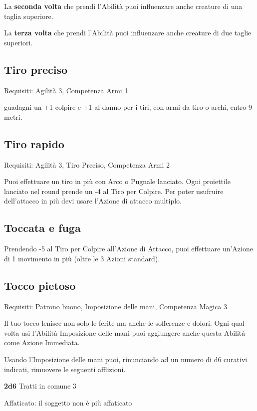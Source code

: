 \documentclass[a4paper,11pt,twoside,openany]{book}
\begin{document}
La \textbf{seconda volta} che prendi l'Abilità puoi influenzare anche creature di una taglia superiore.

La \textbf{terza volta} che prendi l'Abilità puoi influenzare anche creature di due taglie superiori.

\subsection{Tiro preciso}

Requisiti: Agilità 3, Competenza Armi 1

guadagni un +1 colpire e +1 al danno per i tiri, con armi da tiro o archi, entro 9 metri.

\subsection{Tiro rapido}

Requisiti: Agilità 3, Tiro Preciso, Competenza Armi 2

Puoi effettuare un tiro in più con Arco o Pugnale lanciato. Ogni
proiettile lanciato nel round prende un -4 al Tiro per Colpire. Per
poter usufruire dell'attacco in più devi usare l'Azione di attacco
multiplo.

\subsection{Toccata e fuga}

Prendendo -5 al Tiro per Colpire all'Azione di Attacco, puoi effettuare un'Azione di 1 movimento in più (oltre le 3 Azioni standard).

\subsection{Tocco pietoso}

Requisiti: Patrono buono, Imposizione delle mani, Competenza Magica 3

Il tuo tocco lenisce non solo le ferite ma anche le sofferenze e dolori. Ogni qual volta usi l'Abilità Imposizione delle mani puoi aggiungere anche questa Abilità come Azione Immediata.

Usando l'Imposizione delle mani puoi, rinunciando ad un numero di d6 curativi indicati, rimuovere le seguenti afflizioni.

\textbf{2d6} Tratti in comune 3

Affaticato: il soggetto non è più affaticato
\end{document}
